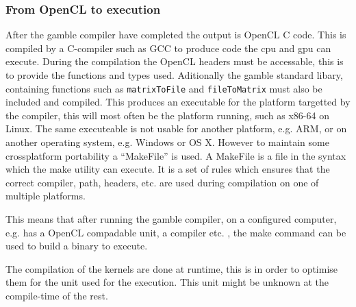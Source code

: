 \subsubsection*{From OpenCL to execution}
After the \gls{gamble} compiler have completed the output is OpenCL C code.
This is compiled by a C-compiler such as GCC to produce code the \acrshort{cpu} and \acrshort{gpu} can execute.
During the compilation the OpenCL headers must be accessable, this is to provide the functions and types used. 
Aditionally the \gls{gamble} standard libary, containing functions such as \texttt{matrixToFile} and \texttt{fileToMatrix} must also be included and compiled. 
This produces an executable for the platform targetted by the compiler, this will most often be the platform running, such as x86-64 on Linux.
The same executeable is not usable for another platform, e.g. ARM, or on another operating system, e.g. Windows or OS X. 
However to maintain some crossplatform portability a ``MakeFile'' is used. 
A MakeFile is a file in the syntax which the make utility can execute. 
It is a set of rules which ensures that the correct compiler, path, headers, etc. are used during compilation on one of multiple platforms. 

This means that after running the \gls{gamble} compiler, on a configured computer, e.g. has a OpenCL compadable unit, a compiler etc. , the make command can be used to build a binary to execute.

The compilation of the kernels are done at runtime, this is in order to optimise them for the unit used for the execution. 
This unit might be unknown at the compile-time of the rest. 